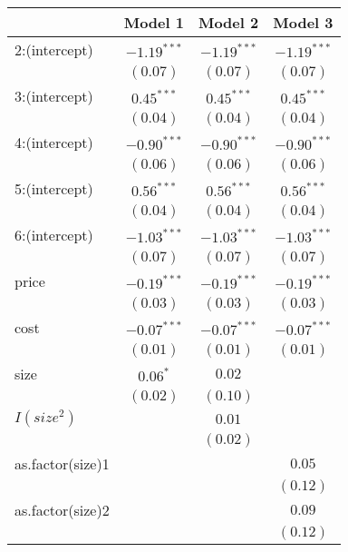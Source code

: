 
\begin{table}
\tiny
\begin{center}
\begin{tabular}{l c c c }
\hline
 & Model 1 & Model 2 & Model 3 \\
\hline
2:(intercept)    & $-1.19^{***}$ & $-1.19^{***}$ & $-1.19^{***}$ \\
                 & $(0.07)$      & $(0.07)$      & $(0.07)$      \\
3:(intercept)    & $0.45^{***}$  & $0.45^{***}$  & $0.45^{***}$  \\
                 & $(0.04)$      & $(0.04)$      & $(0.04)$      \\
4:(intercept)    & $-0.90^{***}$ & $-0.90^{***}$ & $-0.90^{***}$ \\
                 & $(0.06)$      & $(0.06)$      & $(0.06)$      \\
5:(intercept)    & $0.56^{***}$  & $0.56^{***}$  & $0.56^{***}$  \\
                 & $(0.04)$      & $(0.04)$      & $(0.04)$      \\
6:(intercept)    & $-1.03^{***}$ & $-1.03^{***}$ & $-1.03^{***}$ \\
                 & $(0.07)$      & $(0.07)$      & $(0.07)$      \\
price            & $-0.19^{***}$ & $-0.19^{***}$ & $-0.19^{***}$ \\
                 & $(0.03)$      & $(0.03)$      & $(0.03)$      \\
cost             & $-0.07^{***}$ & $-0.07^{***}$ & $-0.07^{***}$ \\
                 & $(0.01)$      & $(0.01)$      & $(0.01)$      \\
size             & $0.06^{*}$    & $0.02$        &               \\
                 & $(0.02)$      & $(0.10)$      &               \\
$I(size^2)$        &               & $0.01$        &               \\
                 &               & $(0.02)$      &               \\
as.factor(size)1 &               &               & $0.05$        \\
                 &               &               & $(0.12)$      \\
as.factor(size)2 &               &               & $0.09$        \\
                 &               &               & $(0.12)$      \\

\end{tabular}
\end{center}
\end{table}
